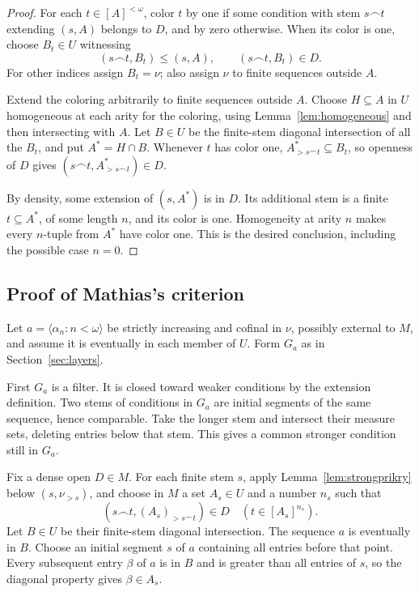 \documentclass[11pt,letterpaper]{article}
\theoremstyle{definition}
\numberwithin{equation}{section}
\newcommand{\suff}{\mathbin{\smallfrown}}
\begin{document}
\begin{proof}
For each $t\in[A]^{<\omega}$, color $t$ by one if some condition with
stem $s\suff t$ extending $(s,A)$ belongs to $D$, and by zero
otherwise. When its color is one, choose $B_t\in U$ witnessing
\[
 (s\suff t,B_t)\le(s,A),\qquad (s\suff t,B_t)\in D.
\]
For other indices assign $B_t=\nu$; also assign $\nu$ to finite
sequences outside $A$.

Extend the coloring arbitrarily to finite sequences outside $A$.
Choose $H\subseteq A$ in $U$ homogeneous at each arity for the
coloring, using Lemma~\ref{lem:homogeneous} and then intersecting
with $A$. Let $B\in U$ be the
finite-stem diagonal intersection of all the $B_t$, and put
$A^*=H\cap B$. Whenever $t$ has color one,
$A^*_{>s\suff t}\subseteq B_t$, so openness of $D$ gives
$(s\suff t,A^*_{>s\suff t})\in D$.

By density, some extension of $(s,A^*)$ is in $D$. Its additional
stem is a finite $t\subseteq A^*$, of some length $n$, and its color
is one. Homogeneity at arity $n$ makes every $n$-tuple from $A^*$
have color one. This is the desired conclusion, including the
possible case $n=0$.
\end{proof}

\subsection{Proof of Mathias's criterion}

Let $a=\langle\alpha_n:n<\omega\rangle$ be strictly increasing and
cofinal in $\nu$, possibly external to $M$, and assume it is
eventually in each member of $U$. Form $G_a$ as in
Section~\ref{sec:layers}.

First $G_a$ is a filter. It is closed toward weaker conditions by the
extension definition. Two stems of conditions in $G_a$ are initial
segments of the same sequence, hence comparable. Take the longer
stem and intersect their measure sets, deleting entries below that
stem. This gives a common stronger condition still in $G_a$.

Fix a dense open $D\in M$. For each finite stem $s$, apply
Lemma~\ref{lem:strongprikry} below $(s,\nu_{>s})$, and choose in $M$
a set $A_s\in U$ and a number $n_s$ such that
\[
 (s\suff t,(A_s)_{>s\suff t})\in D
 \quad(t\in[A_s]^{n_s}).
\]
Let $B\in U$ be their finite-stem diagonal intersection.
The sequence $a$ is eventually in $B$. Choose an initial segment
$s$ of $a$ containing all entries before that point. Every subsequent
entry $\beta$ of $a$ is in $B$ and is greater than all entries of $s$,
so the diagonal property gives $\beta\in A_s$.
\end{document}

